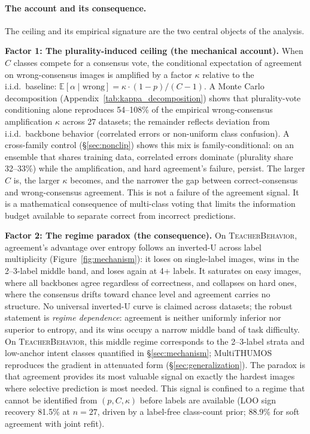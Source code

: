 \documentclass[a4paper,fleqn]{cas-sc}
\newcommand{\tb}{\textsc{TeacherBehavior}}
\begin{document}
\paragraph{The account and its consequence.}
The ceiling and its empirical signature are the two central objects of the analysis.

\textbf{Factor 1: The plurality-induced ceiling (the mechanical account).}
When $C$ classes compete for a consensus vote, the conditional expectation of agreement on wrong-consensus images is amplified by a factor $\kappa$ relative to the i.i.d.\ baseline: $\mathbb{E}[\alpha \mid \text{wrong}] = \kappa \cdot (1-p)/(C-1)$.
A Monte Carlo decomposition (Appendix~\ref{tab:kappa_decomposition}) shows that plurality-vote conditioning alone reproduces 54--108\% of the empirical wrong-consensus amplification $\kappa$ across 27 datasets; the remainder reflects deviation from i.i.d.\ backbone behavior (correlated errors or non-uniform class confusion).
A cross-family control (\S\ref{sec:nonclip}) shows this mix is family-conditional: on an ensemble that shares training data, correlated errors dominate (plurality share 32--33\%) while the amplification, and hard agreement's failure, persist.
The larger $C$ is, the larger $\kappa$ becomes, and the narrower the gap between correct-consensus and wrong-consensus agreement.
This is not a failure of the agreement signal. It is a mathematical consequence of multi-class voting that limits the information budget available to separate correct from incorrect predictions.

\textbf{Factor 2: The regime paradox (the consequence).}
On \tb, agreement's advantage over entropy follows an inverted-U across label multiplicity (Figure~\ref{fig:mechanism}): it loses on single-label images, wins in the 2--3-label middle band, and loses again at 4+ labels. It saturates on easy images, where all backbones agree regardless of correctness, and collapses on hard ones, where the consensus drifts toward chance level and agreement carries no structure.
No universal inverted-U curve is claimed across datasets; the robust statement is \emph{regime dependence}: agreement is neither uniformly inferior nor superior to entropy, and its wins occupy a narrow middle band of task difficulty.
On \tb, this middle regime corresponds to the 2--3-label strata and low-anchor intent classes quantified in \S\ref{sec:mechanism}; MultiTHUMOS reproduces the gradient in attenuated form (\S\ref{sec:generalization}).
The paradox is that agreement provides its most valuable signal on exactly the hardest images where selective prediction is most needed. This signal is confined to a regime that cannot be identified from $(p, C, \kappa)$ before labels are available (LOO sign recovery 81.5\% at $n{=}27$, driven by a label-free class-count prior; 88.9\% for soft agreement with joint refit).
\end{document}
